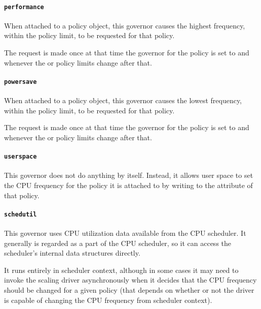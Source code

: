 \documentclass[a4paper,8pt,english]{sphinxmanual}
\begin{document}
\paragraph{\texttt{performance}}
\label{admin-guide/pm/cpufreq:performance}
When attached to a policy object, this governor causes the highest frequency,
within the  policy limit, to be requested for that policy.

The request is made once at that time the governor for the policy is set to
 and whenever the  or 
policy limits change after that.


\paragraph{\texttt{powersave}}
\label{admin-guide/pm/cpufreq:powersave}
When attached to a policy object, this governor causes the lowest frequency,
within the  policy limit, to be requested for that policy.

The request is made once at that time the governor for the policy is set to
 and whenever the  or 
policy limits change after that.


\paragraph{\texttt{userspace}}
\label{admin-guide/pm/cpufreq:userspace}
This governor does not do anything by itself.  Instead, it allows user space
to set the CPU frequency for the policy it is attached to by writing to the
 attribute of that policy.


\paragraph{\texttt{schedutil}}
\label{admin-guide/pm/cpufreq:schedutil}
This governor uses CPU utilization data available from the CPU scheduler.  It
generally is regarded as a part of the CPU scheduler, so it can access the
scheduler's internal data structures directly.

It runs entirely in scheduler context, although in some cases it may need to
invoke the scaling driver asynchronously when it decides that the CPU frequency
should be changed for a given policy (that depends on whether or not the driver
is capable of changing the CPU frequency from scheduler context).
\end{document}
